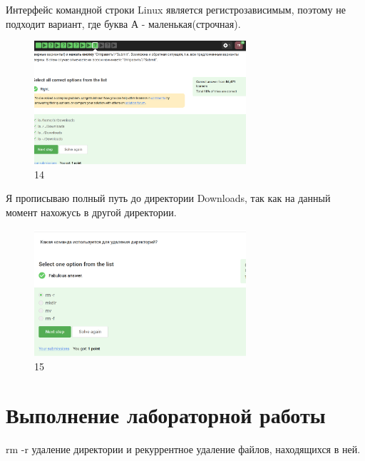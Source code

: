 Интерфейс командной строки Linux является регистрозависимым, поэтому не
подходит вариант, где буква А - маленькая(строчная).

\begin{figure}
\hypertarget{fig:014}{%
\centering
\includegraphics[width=0.7\textwidth,height=\textheight]{image/14.png}
\caption{14}\label{fig:014}
}
\end{figure}

Я прописываю полный путь до директории Downloads, так как на данный
момент нахожусь в другой директории.

\begin{figure}
\hypertarget{fig:015}{%
\centering
\includegraphics[width=0.7\textwidth,height=\textheight]{image/15.png}
\caption{15}\label{fig:015}
}
\end{figure}

\hypertarget{ux432ux44bux43fux43eux43bux43dux435ux43dux438ux435-ux43bux430ux431ux43eux440ux430ux442ux43eux440ux43dux43eux439-ux440ux430ux431ux43eux442ux44b-11}{%
\section{Выполнение лабораторной
работы}\label{ux432ux44bux43fux43eux43bux43dux435ux43dux438ux435-ux43bux430ux431ux43eux440ux430ux442ux43eux440ux43dux43eux439-ux440ux430ux431ux43eux442ux44b-11}}

rm -r удаление директории и рекуррентное удаление файлов, находящихся в
ней.


